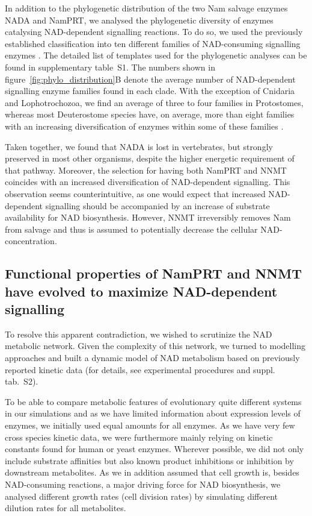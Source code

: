 In addition to the phylogenetic distribution of the two Nam salvage enzymes NADA and NamPRT, we analysed the phylogenetic diversity of enzymes catalysing NAD-dependent signalling reactions. To do so, we used the previously established classification into ten different families of NAD-consuming signalling enzymes \cite{Gossmann2012FEBS}. The detailed list of templates used for the phylogenetic analyses can be found in supplementary table~S1. The numbers shown in figure~\ref{fig:phylo_distribution}B denote the average number of NAD-dependent signalling enzyme families found in each clade. With the exception of Cnidaria and Lophotrochozoa, we find an average of three to four families in Protostomes, whereas most Deuterostome species have, on average, more than eight families with an increasing diversification of enzymes within some of these families \cite{Gossmann2014DNAR}.

Taken together, we found that NADA is lost in vertebrates, but strongly preserved in most other organisms, despite the higher energetic requirement of that pathway. Moreover, the selection for having both NamPRT and NNMT coincides with an increased diversification of NAD-dependent signalling. This observation seems counterintuitive, as one would expect that increased NAD-dependent signalling should be accompanied by an increase of substrate availability for NAD biosynthesis. However, NNMT irreversibly removes Nam from salvage and thus is assumed to potentially decrease the cellular NAD-concentration.


\subsection{Functional properties of NamPRT and NNMT have evolved to maximize NAD-dependent signalling}

To resolve this apparent contradiction, we wished to scrutinize the NAD metabolic network. Given the complexity of this network, we turned to modelling approaches and built a dynamic model of NAD metabolism based on previously reported kinetic data (for details, see experimental procedures and suppl. tab.~S2).

To be able to compare metabolic features of evolutionary quite different systems in our simulations and as we have limited information about expression levels of enzymes, we initially used equal amounts for all enzymes. As we have very few cross species kinetic data, we were furthermore mainly relying on kinetic constants found for human or yeast enzymes.  Wherever possible, we did not only include substrate affinities but also known product inhibitions or inhibition by downstream metabolites. As we in addition assumed that cell growth is, besides NAD-consuming reactions, a major driving force for NAD biosynthesis, we analysed different growth rates (cell division rates) by simulating different dilution rates for all metabolites.

